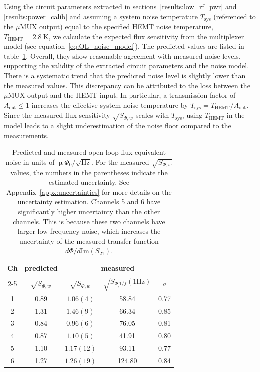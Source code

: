 \documentclass[
 prd,
 reprint,
 superscriptaddress,
 amsmath,amssymb,
 aps,
 floatfix,
]{revtex4-2}
\newcommand{\uMUX}{$\mu$MUX\xspace}
\newcommand{\uPhirtHz}{$\upmu \Phi_0/\sqrt{\text{Hz}}$\xspace}
\begin{document}
Using the circuit parameters extracted in sections~\ref{results:low_rf_pwr} and \ref{results:power_calib} and assuming a system noise temperature $T_{\text{sys}}$ (referenced to the \uMUX output) equal to the specified HEMT noise temperature, $T_{\text{HEMT}} = 2.8~\mathrm{K}$, we calculate the expected flux sensitivity from the multiplexer model (see equation~\eqref{eq:OL_noise_model}). The predicted values are listed in table~\ref{tab:open_loop_noise}. Overall, they show reasonable agreement with measured noise levels, supporting the validity of the extracted circuit parameters and the noise model. There is a systematic trend that the predicted noise level is slightly lower than the measured values. This discrepancy can be attributed to the loss between the \uMUX output and the HEMT input. In particular, a transmission factor of $A_{\text{out}} \le 1$ increases the effective system noise temperature by $T_{\text{sys}} = T_{\text{HEMT}}/A_{\text{out}}$. Since the measured flux sensitivity $\sqrt{S_{\Phi,w}}$ scales with $T_{\text{sys}}$, using $T_{\text{HEMT}}$ in the model leads to a slight underestimation of the noise floor compared to the measurements.


\begin{table}[htb]
    \centering
    \begin{tabular}{c c ccc}
    \hline
         \multirow{2}{*}{Ch} & predicted & \multicolumn{3}{c}{measured} \\
         \cline{2-5}
         & $\sqrt{S_{\Phi,w}}$ & $\sqrt{S_{\Phi,w}}$ & \small{$\sqrt{S_{\Phi_, 1/f} (1 \text{Hz})}$} & $a$ \\
    \hline
    1 & 0.89 & $1.06 (4)$ & 58.84 & 0.77\\
    2 & 1.31 & $1.46 (9)$ & 66.34 & 0.85\\
    3 & 0.84 & $0.96 (6)$ & 76.05 & 0.81\\
    4 & 0.87 & $1.10 (5)$ & 41.91 & 0.80\\
    5 & 1.10 & $1.17 (12)$ & 93.11 & 0.77\\
    6 & 1.27 & $1.26 (19)$ & 124.80 & 0.84\\
    \hline
    \end{tabular}
    \caption{Predicted and measured open-loop flux equivalent noise in units of \uPhirtHz. For the measured $\sqrt{S_{\Phi,w}}$ values, the numbers in the parentheses indicate the estimated uncertainty. See Appendix~\ref{appx:uncertainties} for more details on the uncertainty estimation. Channels 5 and 6 have significantly higher uncertainty than the other channels. This is because these two channels have larger low frequency noise, which increases the uncertainty of the measured transfer function $d\Phi/d\mathrm{Im}(S_{21})$.}
    \label{tab:open_loop_noise}
\end{table}
\end{document}
